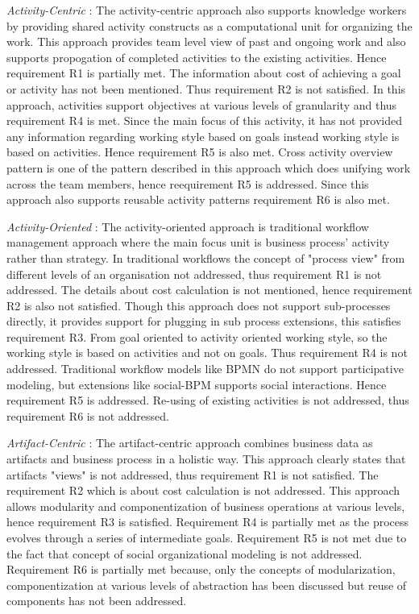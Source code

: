 \textit{Activity-Centric} : The activity-centric approach \cite{Yarosh2009} also supports knowledge workers by providing shared activity constructs as a computational unit for organizing the work. This approach provides team level view of past and ongoing work
and also supports propogation of completed activities to the existing activities. Hence requirement R1 is partially met. The information about cost of achieving a goal or activity has not been mentioned. Thus requirement R2 is not satisfied. In this approach, activities support objectives at various levels of granularity and thus requirement R4 is met. Since the main focus of this activity, it has
not provided any information regarding working style based on goals instead working style is based on activities. Hence requirement R5 is also met. Cross activity overview pattern is one of the pattern described in this approach which does unifying work across the team members, hence reequirement R5 is addressed. Since this approach also supports reusable activity patterns requirement R6 is also met. 
 
\textit{Activity-Oriented} :  The activity-oriented approach \cite{Reijers2006} is traditional workflow management approach where the main focus unit is business process' activity rather than strategy. In traditional workflows the concept of "process view" from different levels of an organisation not addressed, thus requirement R1 is not addressed. The details about cost calculation is not mentioned, hence requirement R2 is also not satisfied. Though this approach does not support sub-processes directly, it provides support for plugging in sub process extensions, this satisfies requirement R3. From goal oriented to activity oriented working style, so the working style is based on activities and not on goals. Thus requirement R4 is not addressed. Traditional workflow models like BPMN do not support participative modeling, but extensions like social-BPM supports social interactions. Hence requirement R5 is addressed. Re-using of existing activities is not addressed, thus requirement R6 is not addressed.  

\textit{Artifact-Centric} :  The artifact-centric approach \cite{Cohn2009} combines business data as artifacts and business process in a holistic way. This approach clearly states that artifacts "views" is not addressed, thus requirement R1 is not satisfied. The requirement R2 which is about cost calculation is not addressed. This approach allows modularity and componentization of business operations at various levels, hence requirement R3 is satisfied. Requirement R4  is partially met as the process evolves through a series of
intermediate goals. Requirement R5 is not met due to the fact that concept of social organizational modeling is not addressed. Requirement R6 is partially met because, only the concepts of modularization, componentization at various levels of abstraction has been discussed but reuse of components has not been addressed.

